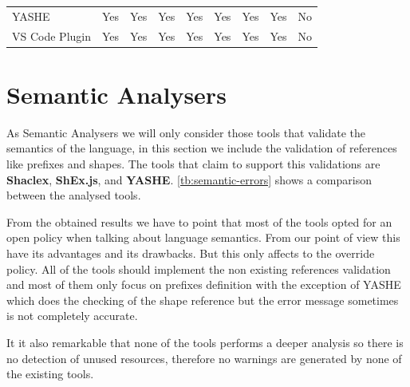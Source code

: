 \begin{table}
{\begin{tabular}{lcccccccc}
    YASHE          & Yes                                   & Yes                                 & Yes                             & Yes                                  & Yes                                  & Yes                                & Yes                                 & No                                                                                   \\
    VS Code Plugin & Yes                                   & Yes                                 & Yes                             & Yes                                  & Yes                                  & Yes                                & Yes                                 & No                                                                                   \\
    \hline
    \end{tabular}}
\end{table}

\section{Semantic Analysers}
As Semantic Analysers we will only consider those tools that validate the semantics of the language, in this section we
include the validation of references like prefixes and shapes. The tools that claim to support this validations are
\textbf{Shaclex}, \textbf{ShEx.js}, and \textbf{YASHE}. \cref{tb:semantic-errors} shows a comparison between the analysed tools.

From the obtained results we have to point that most of the tools opted for an open policy when talking about language semantics. From our
point of view this have its advantages and its drawbacks. But this only affects to the override policy. All of the tools should
implement the non existing references validation and most of them only focus on prefixes definition with the exception of
YASHE which does the checking of the shape reference but the error message sometimes is not completely accurate.

It it also remarkable that none of the tools performs a deeper analysis so there is no detection of unused resources, therefore
no warnings are generated by none of the existing tools.

